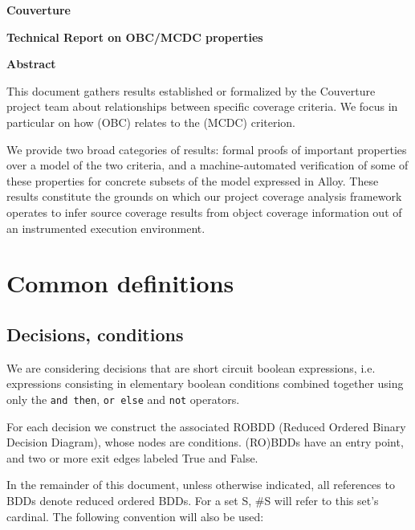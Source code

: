 \documentclass[a4paper,12pt,twoside]{article}
\newcommand{\couv}{{\sc Couverture}}
\newcommand{\andthen}{\texttt{and then}}
\newcommand{\orelse}{\texttt{or else}}
\newcommand{\adanot}{\texttt{not}}
\begin{document}
\pagestyle{empty}

\vfill

\begin{center}%
{\Large \textbf{\couv{}}}

{\Large \textbf{Technical Report on OBC/MCDC properties}}

\vfill

{\large \textbf{Abstract}}
\end{center}

This document gathers results established or formalized by the \couv{}
project team about relationships between specific coverage criteria.
%
We focus in particular on how  (OBC) relates to the
 (MCDC) criterion.

We provide two broad categories of results: formal proofs of important
properties over a model of the two criteria, and a machine-automated
verification of some of these properties for concrete subsets of the model
expressed in Alloy.
%
These results constitute the grounds on which our project coverage analysis
framework operates to infer source coverage results from object coverage
information out of an instrumented execution environment.

\vfill

\newpage
\pagestyle{plain}


\section{Common definitions}

\subsection{Decisions, conditions}

We are considering decisions that are short circuit boolean expressions,
i.e. expressions consisting in elementary boolean conditions combined
together using only the \andthen{}, \orelse{} and \adanot{} operators.

For each decision we construct the associated ROBDD (Reduced Ordered
Binary Decision Diagram), whose nodes are conditions. (RO)BDDs have an
entry point, and two or more exit edges labeled True and False.

In the remainder of this document, unless otherwise indicated, all
references to BDDs denote reduced ordered BDDs. For a set S, \#S will
refer to this set's cardinal. The following convention will also be
used:
\end{document}
